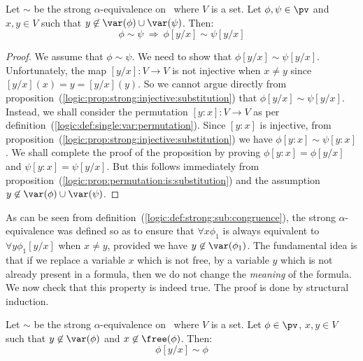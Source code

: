 \begin{prop}\label{logic:prop:substitution:single:var}
Let $\sim$ be the strong $\alpha$-equivalence on \pv\ where $V$
is a set. Let $\phi,\psi\in\pv$ and $x,y\in V$ such that
$y\not\in\var(\phi)\cup\var(\psi)$. Then:
    \[
    \phi\sim\psi\ \Rightarrow\ \phi[y/x]\sim\psi[y/x]
    \]
\end{prop}

\noindent
\begin{proof}
We assume that $\phi\sim\psi$. We need to show that
$\phi[y/x]\sim\psi[y/x]$. Unfortunately, the map $[y/x]:V\to V$ is
not injective when $x\neq y$ since $[y/x](x)=y=[y/x](y)$. So we
cannot argue directly from
proposition~(\ref{logic:prop:strong:injective:substitution}) that
$\phi[y/x]\sim\psi[y/x]$. Instead, we shall consider the permutation
$[y\!:\!x]:V\to V$ as per
definition~(\ref{logic:def:single:var:permutation}). Since
$[y\!:\!x]$ is injective, from
proposition~(\ref{logic:prop:strong:injective:substitution}) we have
$\phi[y\!:\!x]\sim\psi[y\!:\!x]$. We shall complete the proof of the
proposition by proving $\phi[y\!:\!x]=\phi[y/x]$ and
$\psi[y\!:\!x]=\psi[y/x]$. But this follows immediately from
proposition~(\ref{logic:prop:permutation:is:substitution}) and the
assumption $y\not\in\var(\phi)\cup\var(\psi)$.
\end{proof}

As can be seen from
definition~(\ref{logic:def:strong:sub:congruence}), the strong
$\alpha$-equivalence was defined so as to ensure that $\forall
x\phi_{1}$ is always equivalent to $\forall y\phi_{1}[y/x]$ when
$x\neq y$, provided we have $y\not\in\var(\phi_{1})$. The
fundamental idea is that if we replace a variable $x$ which is not
free, by a variable $y$ which is not already present in a formula,
then we do not change the {\em meaning} of the formula. We now check
that this property is indeed true. The proof is done by structural
induction.

\begin{prop}\label{logic:prop:substitution:invariant}
Let $\sim$ be the strong $\alpha$-equivalence on \pv\ where $V$
is a set. Let $\phi\in\pv$, $x,y\in V$ such that
$y\not\in\var(\phi)$ and $x\not\in\free(\phi)$. Then:
    \[
    \phi[y/x]\sim\phi
    \]
\end{prop}

